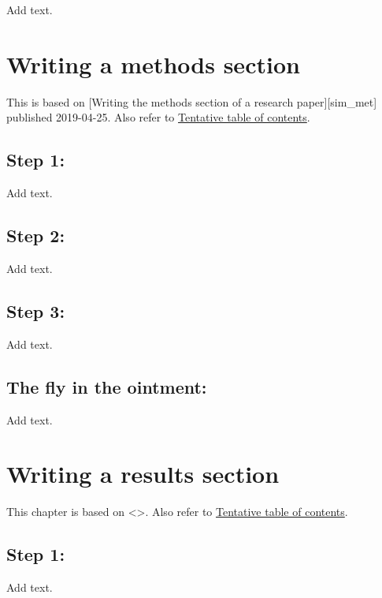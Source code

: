 \documentclass[
  letterpaper,
  DIV=11,
  numbers=noendperiod]{scrreprt}
\begin{document}
Add text.


\chapter{Writing a methods section}\label{writing-a-methods-section}

This is based on {[}Writing the methods section of a research
paper{]}{[}sim\_met{]} published 2019-04-25. Also refer to
\href{http://www.pmean.com/10/Contents.html}{Tentative table of
contents}.

\section{Step 1:}\label{step-1}

Add text.

\section{Step 2:}\label{step-2}

Add text.

\section{Step 3:}\label{step-3}

Add text.

\section{The fly in the ointment:}\label{the-fly-in-the-ointment-5}

Add text.


\chapter{Writing a results section}\label{writing-a-results-section}

This chapter is based on \textless{}\textgreater. Also refer to
\href{http://www.pmean.com/10/Contents.html}{Tentative table of
contents}.

\section{Step 1:}\label{step-1-1}

Add text.
\end{document}
